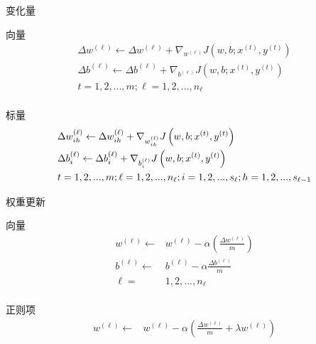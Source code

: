 \begin{frame}{变化量}
\begin{block}{向量}
\[\begin{aligned}
  \Delta {w^{(\ell )}} \leftarrow \Delta {w^{(\ell )}} + {\nabla _{{w^{(\ell )}}}}J\left( {w,b;{x^{(t)}},{y^{(t)}}} \right) \\ 
  \Delta {b^{(\ell )}} \leftarrow \Delta {b^{(\ell )}} + {\nabla _{{b^{(\ell )}}}}J\left( {w,b;{x^{(t)}},{y^{(t)}}} \right) \\ 
  t = 1,2,...,m;\ell  = 1,2,...,{n_\ell } \\ 
\end{aligned} \]
\end{block}

\begin{block}{标量}
\[\begin{gathered}
  \Delta w_{ih}^{(\ell )} \leftarrow \Delta w_{ih}^{(\ell )} + {\nabla _{w_{ih}^{(\ell )}}}J\left( {w,b;{x^{(t)}},{y^{(t)}}} \right) \hfill \\
  \Delta b_i^{(\ell )} \leftarrow \Delta b_i^{(\ell )} + {\nabla _{b_i^{(\ell )}}}J\left( {w,b;{x^{(t)}},{y^{(t)}}} \right) \hfill \\
  t = 1,2,...,m;\ell  = 1,2,...,{n_\ell };i = 1,2,...,{s_\ell };h = 1,2,...,{s_{\ell  - 1}} \hfill \\ 
\end{gathered} \]
\end{block}
\end{frame}

\begin{frame}{权重更新}

\begin{block}{向量}
\[\begin{aligned}
  {w^{(\ell )}} \leftarrow  & {w^{(\ell )}} - \alpha \left( {\frac{{\Delta {w^{(\ell )}}}}{m}} \right) \\ 
  {b^{(\ell )}} \leftarrow  & {b^{(\ell )}} - \alpha \frac{{\Delta {b^{(\ell )}}}}{m} \\ 
  \ell  = & 1,2,...,{n_\ell }  \\
\end{aligned} \]
\end{block}

\begin{block}{正则项}
\[\begin{aligned}
  {w^{(\ell )}} \leftarrow  & {w^{(\ell )}} - \alpha \left( {\frac{{\Delta {w^{(\ell )}}}}{m} + \lambda {w^{(\ell )}}} \right) \\ 
\end{aligned} \]
\end{block}
\end{frame}


